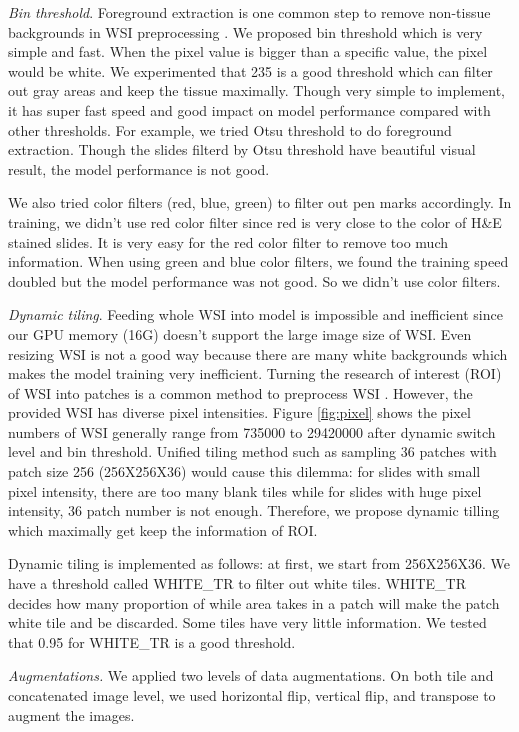 \documentclass{article}
\begin{document}
\textit{Bin threshold}. Foreground extraction is one common step to remove non-tissue backgrounds in WSI preprocessing \citep{duran2020prometeo}. We proposed bin threshold which is very simple and fast. When the pixel value is bigger than a specific value, the pixel would be white. We experimented that 235 is a good threshold which can filter out gray areas and keep the tissue maximally. Though very simple to implement, it has super fast speed and good impact on model performance compared with other thresholds. For example, we tried Otsu threshold \citep{otsu1979threshold} to do foreground extraction. Though the slides filterd by Otsu threshold have beautiful visual result, the model performance is not good.

We also tried color filters (red, blue, green) to filter out pen marks accordingly. In training, we didn't use red color filter since red is very close to the color of H\&E stained slides. It is very easy for the red color filter to remove too much information.  When using green and blue color filters, we found the training speed doubled but the model performance was not good. So we didn't use color filters. 


\textit{Dynamic tiling}. Feeding whole WSI into model is impossible and inefficient since our GPU memory (16G) doesn't support the large image size of WSI. Even resizing WSI is not a good way because there are many white backgrounds which makes the model training very inefficient. Turning the research of interest (ROI) of WSI into patches is a common method to preprocess WSI \citep{li2018path}. However, the provided WSI has diverse pixel intensities. Figure \ref{fig:pixel} shows the pixel numbers of WSI generally range from 735000 to 29420000 after dynamic switch level and bin threshold. Unified tiling method such as sampling 36 patches with patch size 256 (256X256X36) would cause this dilemma: for slides with small pixel intensity, there are too many blank tiles while for slides with huge pixel intensity, 36 patch number is not enough. Therefore, we propose dynamic tilling which maximally get keep the information of ROI. 

Dynamic tiling is implemented as follows: at first, we start from 256X256X36. We have a threshold called WHITE\_TR to filter out white tiles. WHITE\_TR decides how many proportion of while area takes in a patch will make the patch white tile and be discarded. Some tiles have very little information. We tested that 0.95 for WHITE\_TR is a good threshold. 


\textit{Augmentations.} We applied two levels of data augmentations. On both tile and concatenated image level, we used horizontal flip, vertical flip, and transpose to augment the images. 
\end{document}
